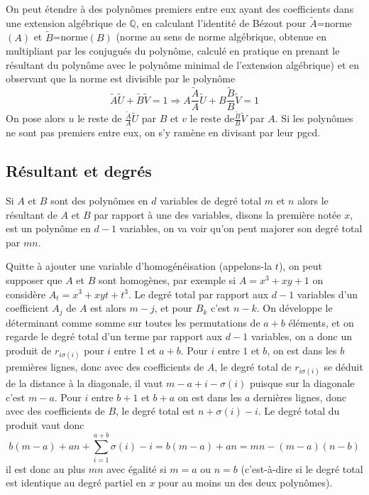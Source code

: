 \documentclass[a4paper,11pt]{article}
\begin{document}
\begin{giacjshere}
On peut \'etendre \`a des polyn\^omes premiers entre eux ayant des coefficients
dans une extension alg\'ebrique de $\mathbb{Q}$, en calculant l'identit\'e
de B\'ezout pour $\tilde{A}$=norme$(A)$ et 
$\tilde{B}$=norme$(B)$ (norme au sens de norme
alg\'ebrique, obtenue en multipliant par les conjugu\'es du
polyn\^ome, calcul\'e en pratique en prenant le r\'esultant
du polyn\^ome avec le polyn\^ome minimal de l'extension
alg\'ebrique) et en observant que
la norme est divisible par le polyn\^ome
$$ \tilde{A} \tilde{U}+\tilde{B}\tilde{V}=1
\Rightarrow A \frac{\tilde{A}}{A} \tilde{U}+ 
B \frac{\tilde{B}}{B}\tilde{V}=1$$
On pose alors $u$ le reste de $ \frac{\tilde{A}}{A} \tilde{U}$ par $B$
et $v$ le reste de$ \frac{\tilde{B}}{B}\tilde{V}$ par $A$.
Si les polyn\^omes ne sont pas premiers entre eux, on s'y ram\`ene
en divisant par leur pgcd.

\subsection{R\'esultant et degr\'es}
Si $A$ et $B$ sont des polyn\^omes en $d$ variables de degr\'e
total $m$ et $n$ alors le r\'esultant de $A$ et $B$ par rapport \`a
une des variables, disons la premi\`ere not\'ee $x$,
 est un polyn\^ome en $d-1$ variables, on va voir qu'on peut
majorer son degr\'e total par $mn$.

Quitte \`a ajouter une variable d'homog\'en\'eisation (appelons-la $t$), on peut
supposer que $A$ et $B$ sont homog\`enes, par exemple
si $A=x^3+xy+1$ on consid\`ere $A_t=x^3+xyt+t^3$. Le degr\'e total 
par rapport aux $d-1$ variables d'un
coefficient $A_j$ de $A$ est alors $m-j$, et pour $B_k$ c'est $n-k$.
On d\'eveloppe le d\'eterminant comme somme sur toutes les
permutations de $a+b$ \'el\'ements, et on regarde le degr\'e
total d'un terme par rapport aux $d-1$ variables, on a donc
un produit de $r_{i \sigma(i)}$ pour $i$ entre 1 et $a+b$. Pour $i$
entre $1$ et $b$, on est dans les $b$ premi\`eres lignes, donc
avec des coefficients de $A$, le degr\'e total de $r_{i \sigma(i)}$
se d\'eduit de la distance \`a la diagonale, il vaut
$m-a+i-\sigma(i)$ puisque sur la diagonale c'est $m-a$.
Pour $i$ entre $b+1$ et $b+a$ on est dans les $a$ derni\`eres
lignes, donc avec des coefficients de $B$, le degr\'e total est
$n+\sigma(i)-i$. Le degr\'e total du produit vaut donc
$$ b(m-a)+an+\sum_{i=1}^{a+b} \sigma(i) -i = b(m-a)+an=mn-(m-a)(n-b)$$
il est donc au plus $mn$ avec \'egalit\'e si $m=a$ ou $n=b$
(c'est-\`a-dire si le degr\'e total est identique au degr\'e partiel
en $x$ pour au moins un des deux polyn\^omes).


\end{giacjshere}
\end{document}
